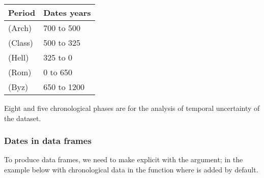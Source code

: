 \documentclass[a4paper,12pt,english]{sphinxhowto}
\begin{document}
\begin{savenotes}\sphinxattablestart
\raggedright
\begin{tabulary}{\linewidth}[t]{|T|T|}
\hline
\sphinxstyletheadfamily 
Period
&\sphinxstyletheadfamily 
Dates years
\\
\hline
{}  (Arch)
&
\sphinxhyphen{}700 to \sphinxhyphen{}500
\\
\hline
{}  (Class)
&
\sphinxhyphen{}500 to \sphinxhyphen{}325
\\
\hline
{}  (Hell)
&
\sphinxhyphen{}325 to 0
\\
\hline
{}  (Rom)
&
0 to 650
\\
\hline
{}  (Byz)
&
650 to 1200
\\
\hline
\end{tabulary}
\par
\sphinxattableend\end{savenotes}

Eight\sphinxhyphen{} and five chronological phases are for the analysis of temporal uncertainty of the  dataset.



\subsubsection{Dates in data frames}
\label{\detokenize{Time:dates-in-data-frames}}
To produce data frames, we need to make explicit with the  argument; in the
example below with chronological data in the function where  is added by default.

\begin{sphinxVerbatim}[commandchars=\\\{\},formatcom=\footnotesize]
     
\end{sphinxVerbatim}
\end{document}
